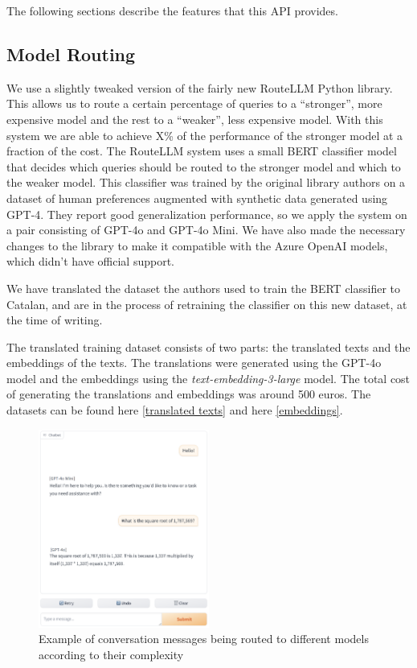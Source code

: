 \documentclass[a4paper,12pt,twoside]{ThesisStyle}
\begin{document}
The following sections describe the features that this API provides.

\subsection{Model Routing}
\label{subsec:model_routing}

We use a slightly tweaked version of the fairly new RouteLLM Python library. This allows us to route a certain percentage of queries to a ``stronger'', more expensive model and the rest to a ``weaker'', less expensive model. With this system we are able to achieve X\% of the performance of the stronger model at a fraction of the cost. The RouteLLM system uses a small BERT classifier model that decides which queries should be routed to the stronger model and which to the weaker model. This classifier was trained by the original library authors on a dataset of human preferences augmented with synthetic data generated using GPT-4. They report good generalization performance, so we apply the system on a pair consisting of GPT-4o and GPT-4o Mini. We have also made the necessary changes to the library to make it compatible with the Azure OpenAI models, which didn't have official support.

We have translated the dataset the authors used to train the BERT classifier to Catalan, and are in the process of retraining the classifier on this new dataset, at the time of writing.

The translated training dataset consists of two parts: the translated texts and the embeddings of the texts. The translations were generated using the GPT-4o model and the embeddings using the \textit{text-embedding-3-large} model. The total cost of generating the translations and embeddings was around 500 euros. The datasets can be found here \href{https://huggingface.co/datasets/SupremeLobster/gpt4_judge_battles_catalan}{[translated texts]} and here \href{https://huggingface.co/datasets/SupremeLobster/gpt4_judge_battles_catalan_embeddings}{[embeddings]}.

\begin{figure}[H]
  \centering
  \includegraphics[width=0.5\textwidth]{imatges/Routed conversation.png}
  \caption{Example of conversation messages being routed to different models according to their complexity}
  \label{fig:model_routing_example}
\end{figure}
\end{document}

